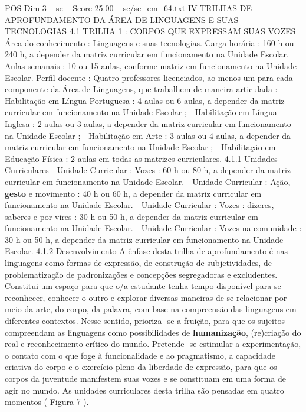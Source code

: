 \begin{textsample}{POS Dim 3 – sc – Score 25.00 – sc/sc\_em\_64.txt}  \label{ex:f3_pos_061}
IV TRILHAS DE APROFUNDAMENTO DA ÁREA DE LINGUAGENS E SUAS TECNOLOGIAS 4.1 TRILHA 1 : CORPOS QUE EXPRESSAM SUAS VOZES Área do conhecimento : Linguagens e suas tecnologias.
Carga horária : 160 h ou 240 h, a depender da matriz curricular em funcionamento na Unidade Escolar.
Aulas semanais : 10 ou 15 aulas, conforme matriz em funcionamento na Unidade Escolar.
Perfil docente : Quatro professores licenciados, ao menos um para cada componente da Área de Linguagens, que trabalhem de maneira articulada : - Habilitação em Língua Portuguesa : 4 aulas ou 6 aulas, a depender da matriz curricular em funcionamento na Unidade Escolar ; - Habilitação em Língua Inglesa : 2 aulas ou 3 aulas, a depender da matriz curricular em funcionamento na Unidade Escolar ; - Habilitação em Arte : 3 aulas ou 4 aulas, a depender da matriz curricular em funcionamento na Unidade Escolar ; - Habilitação em Educação Física : 2 aulas em todas as matrizes curriculares. 4.1.1 Unidades Curriculares - Unidade Curricular : Vozes : 60 h ou 80 h, a depender da matriz curricular em funcionamento na Unidade Escolar. - Unidade Curricular : Ação, \textbf{gesto} e movimento : 40 h ou 60 h, a depender da matriz curricular em funcionamento na Unidade Escolar. - Unidade Curricular : Vozes : dizeres, saberes e por-vires : 30 h ou 50 h, a depender da matriz curricular em funcionamento na Unidade Escolar. - Unidade Curricular : Vozes na comunidade : 30 h ou 50 h, a depender da matriz curricular em funcionamento na Unidade Escolar. 4.1.2 Desenvolvimento A ênfase desta trilha de aprofundamento é nas linguagens como formas de expressão, de construção de subjetividades, de problematização de padronizações e concepções segregadoras e excludentes.
Constitui um espaço para que o/a estudante tenha tempo disponível para se reconhecer, conhecer o outro e explorar diversas maneiras de se relacionar por meio da arte, do corpo, da palavra, com base na compreensão das linguagens em diferentes contextos.
Nesse sentido, prioriza -se a fruição, para que os sujeitos compreendam as linguagens como possibilidades de \textbf{humanização}, (re)criação do real e reconhecimento crítico do mundo.
Pretende -se estimular a experimentação, o contato com o que foge à funcionalidade e ao pragmatismo, a capacidade criativa do corpo e o exercício pleno da liberdade de expressão, para que os corpos da juventude manifestem suas vozes e se constituam em uma forma de agir no mundo.
As unidades curriculares desta trilha são pensadas em quatro momentos ( Figura 7 ).

\end{textsample}
